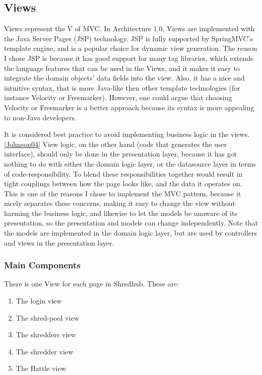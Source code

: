 \subsection{Views}
Views represent the V of MVC. In Architecture 1.0, Views are implemented with the Java Server Pages (JSP) technology. JSP is fully supported by SpringMVC's template engine, and is a popular choice for dynamic view generation. The reason I chose JSP is because it has good support for many tag libraries, which extends the language features that can be used in the Views, and it makes it easy to integrate  the domain objects' data fields into the view. Also, it has a nice and intuitive syntax, that is more Java-like then other template technologies (for instance Velocity or Freemarker). However, one could argue that choosing Velocity or Freemarker is a better approach because its syntax is more appealing to non-Java developers. 

It is considered best practice to avoid implementing business logic in the views. \vref{Johnson04} View logic, on the other hand (code that generates the user interface), should only be done in the presentation layer, because it has got nothing to do with either the domain logic layer, or the datasource layer in terms of code-responsibility. To blend these responsibilities together would result in tight couplings between how the page looks like, and the data it operates on. This is one of the reasons I chose to implement the MVC pattern, because it nicely separates these concerns, making it easy to change the view without harming the business logic, and likewise to let the models be unaware of its presentation, so the presentation and models can change independently. Note that the models are implemented in the domain logic layer, but are used by controllers and views in the presentation layer.

\subsubsection{Main Components}
There is one View for each page in Shredhub. These are:
\begin{enumerate}
\item{} The login view
\item{} The shred-pool view
\item{} The shredders view
\item{} The shredder view
\item{} The Battle view
\end{enumerate}


